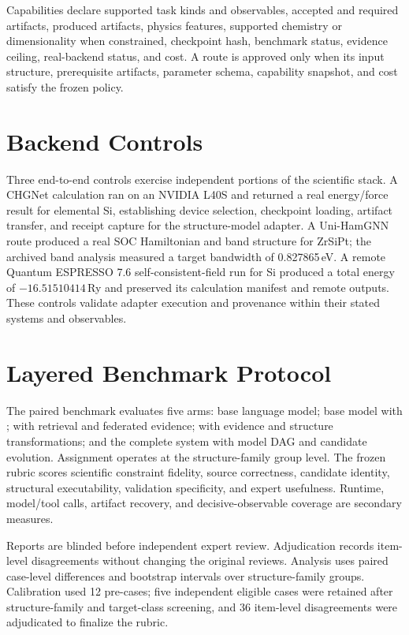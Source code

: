 Capabilities declare supported task kinds and observables, accepted and required artifacts, produced artifacts, physics features, supported chemistry or dimensionality when constrained, checkpoint hash, benchmark status, evidence ceiling, real-backend status, and cost.  A route is approved only when its input structure, prerequisite artifacts, parameter schema, capability snapshot, and cost satisfy the frozen policy.

\section{Backend Controls}
\label{app:controls}

Three end-to-end controls exercise independent portions of the scientific stack.  A CHGNet calculation ran on an NVIDIA L40S and returned a real energy/force result for elemental Si, establishing device selection, checkpoint loading, artifact transfer, and receipt capture for the structure-model adapter.  A Uni-HamGNN route produced a real SOC Hamiltonian and band structure for ZrSiPt; the archived band analysis measured a target bandwidth of 0.827865\,eV.  A remote Quantum ESPRESSO 7.6 self-consistent-field run for Si produced a total energy of $-16.51510414$\,Ry and preserved its calculation manifest and remote outputs.  These controls validate adapter execution and provenance within their stated systems and observables.

\section{Layered Benchmark Protocol}
\label{app:benchmark}

The paired benchmark evaluates five arms: base language model; base model with \hermes; \hermes with retrieval and federated evidence; \hermes with evidence and structure transformations; and the complete system with model DAG and candidate evolution.  Assignment operates at the structure-family group level.  The frozen rubric scores scientific constraint fidelity, source correctness, candidate identity, structural executability, validation specificity, and expert usefulness.  Runtime, model/tool calls, artifact recovery, and decisive-observable coverage are secondary measures.

Reports are blinded before independent expert review.  Adjudication records item-level disagreements without changing the original reviews.  Analysis uses paired case-level differences and bootstrap intervals over structure-family groups.  Calibration used 12 pre-cases; five independent eligible cases were retained after structure-family and target-class screening, and 36 item-level disagreements were adjudicated to finalize the rubric.

